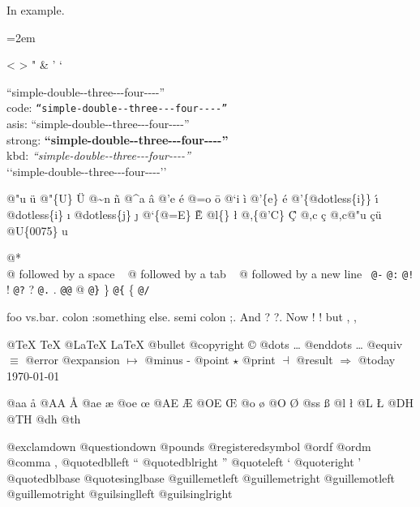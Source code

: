 \documentclass{book}
\newenvironment{GNUTexinfopreformatted}{%
  \par\begingroup\obeylines\obeyspaces\frenchspacing}{\endgroup}
\begin{document}
In example.
\begin{GNUTexinfopreformatted}
\leftskip=2em \parskip=0pt \parindent=0pt \ttfamily%

<
>
"
\&
'
`

``simple-double{-}{-}three{-}{-}{-}four{-}{-}{-}-''\leavevmode{}\\
code: \texttt{``simple-double{-}{-}three{-}{-}{-}four{-}{-}{-}-''} \leavevmode{}\\
asis: ``simple-double{-}{-}three{-}{-}{-}four{-}{-}{-}-'' \leavevmode{}\\
strong: \textbf{``simple-double{-}{-}three{-}{-}{-}four{-}{-}{-}-''} \leavevmode{}\\
kbd: {\ttfamily\textsl{``simple-double{-}{-}three{-}{-}{-}four{-}{-}{-}-''}} \leavevmode{}\\

`\hbox{}`simple-double-\hbox{}-three{-}{-}{-}four{-}{-}{-}-'\hbox{}'\leavevmode{}\\

%
%
%
%

@"u \"{u} 
@"\{U\} \"{U} 
@\~{}n \~{n}
@\^{}a \^{a}
@'e \'{e}
@=o \={o}
@`i \`{i}
@'\{e\} \'{e}
@'\{@dotless\{i\}\} \'{\i{}} 
@dotless\{i\} \i{}
@dotless\{j\} \j{}
@`\{@=E\} \`{\={E}} 
@l\{\} \l{}
@,\{@'C\} \c{\'{C}}
@,c \c{c}
@,c@"u \c{c}\"{u} \leavevmode{}\\

@U\{0075\} u

@* \leavevmode{}\\
@ followed by a space
\ {}
@ followed by a tab
\ {}
@ followed by a new line
\ {}\texttt{@-} \-{}
\texttt{@:} \@
\texttt{@!} \@!
\texttt{@?} \@?
\texttt{@.} \@.
\texttt{@@} @
\texttt{@\}} \}
\texttt{@\{} \{
\texttt{@/} 

foo vs.\@ bar. 
colon :\@And something else.
semi colon ;\@.
And ? ?\@.
Now ! !\@@
but , ,\@

@TeX \TeX{}
@LaTeX \LaTeX{}
@bullet \textbullet{}
@copyright \copyright{}
@dots \dots{}\@
@enddots \dots{}
@equiv $\equiv{}$
@error 
@expansion $\mapsto{}$
@minus -
@point $\star{}$
@print $\dashv{}$
@result $\Rightarrow{}$
@today \today{}

@aa \aa{}
@AA \AA{}
@ae \ae{}
@oe \oe{}
@AE \AE{}
@OE \OE{}
@o \o{}
@O \O{}
@ss \ss{}
@l \l{}
@L \L{}
@DH \DH{}
@TH \TH{}
@dh \dh{}
@th \th{}

@exclamdown \textexclamdown{}
@questiondown \textquestiondown{}
@pounds \textsterling{}
@registeredsymbol \circledR{}
@ordf \textordfeminine{}
@ordm \textordmasculine{}
@comma ,
@quotedblleft \textquotedblleft{}
@quotedblright \textquotedblright{}
@quoteleft \textquoteleft{}
@quoteright \textquoteright{}
@quotedblbase \quotedblbase{}
@quotesinglbase \quotesinglbase{}
@guillemetleft \guillemotleft{}
@guillemetright \guillemotright{}
@guillemotleft \guillemotleft{}
@guillemotright \guillemotright{}
@guilsinglleft \guilsinglleft{}
@guilsinglright \guilsinglright{}


\end{GNUTexinfopreformatted}
\end{document}
